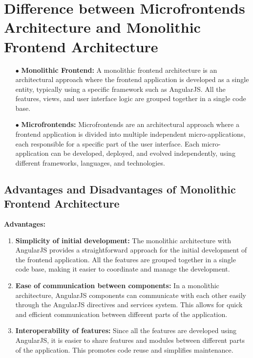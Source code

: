 \section{Difference between Microfrontends Architecture and Monolithic Frontend Architecture}
\begin{enumerate}
\item[$\bullet$] \textbf{Monolithic Frontend:} A monolithic frontend architecture is an architectural approach where the frontend application is developed as a single entity, typically using a specific framework such as AngularJS. All the features, views, and user interface logic are grouped together in a single code base.
\item[$\bullet$] \textbf{Microfrontends:} Microfrontends are an architectural approach where a frontend application is divided into multiple independent micro-applications, each responsible for a specific part of the user interface. Each micro-application can be developed, deployed, and evolved independently, using different frameworks, languages, and technologies.
\end{enumerate}

\subsection{Advantages and Disadvantages of Monolithic Frontend Architecture}
\textbf{Advantages:}
\begin{enumerate}
\item \textbf{Simplicity of initial development:} The monolithic architecture with AngularJS provides a straightforward approach for the initial development of the frontend application. All the features are grouped together in a single code base, making it easier to coordinate and manage the development.
\item \textbf{Ease of communication between components:} In a monolithic architecture, AngularJS components can communicate with each other easily through the AngularJS directives and services system. This allows for quick and efficient communication between different parts of the application.
\item \textbf{Interoperability of features:} Since all the features are developed using AngularJS, it is easier to share features and modules between different parts of the application. This promotes code reuse and simplifies maintenance.
\end{enumerate}

